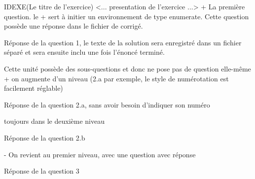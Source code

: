 \documentclass[11pt,report,oneside,solution]{cpgedev}
\begin{document}
\begin{latex}
\begin{exercice}{IDEXE}(Le titre de l'exercice)
     <... presentation de l'exercice ...>
\xques+ La première question. le + sert à initier un environnement de type enumerate. Cette question possède une réponse dans le fichier de corrigé.
\begin{solution}
     Réponse de la question 1, le texte de la solution sera enregistré dans un fichier séparé et sera ensuite inclu une fois l'énoncé terminé. 
\end{solution}
\zques Cette unité possède des sous-questions et donc ne pose pas 
de question elle-même
     \xques+ on augmente d'un niveau (2.a par exemple, le style de numérotation est facilement réglable)
     \begin{solution}
          Réponse de la question 2.a, sans avoir besoin d'indiquer son numéro 
     \end{solution}
     \xques toujours dans le deuxième niveau
     \begin{solution}
          Réponse de la question  2.b
     \end{solution}
\xques- On revient au premier niveau, avec une question avec réponse 
\begin{solution}
     Réponse de la question 3 
\end{solution}
\exit %
\end{exercice}
\end{latex} 
\end{document}
